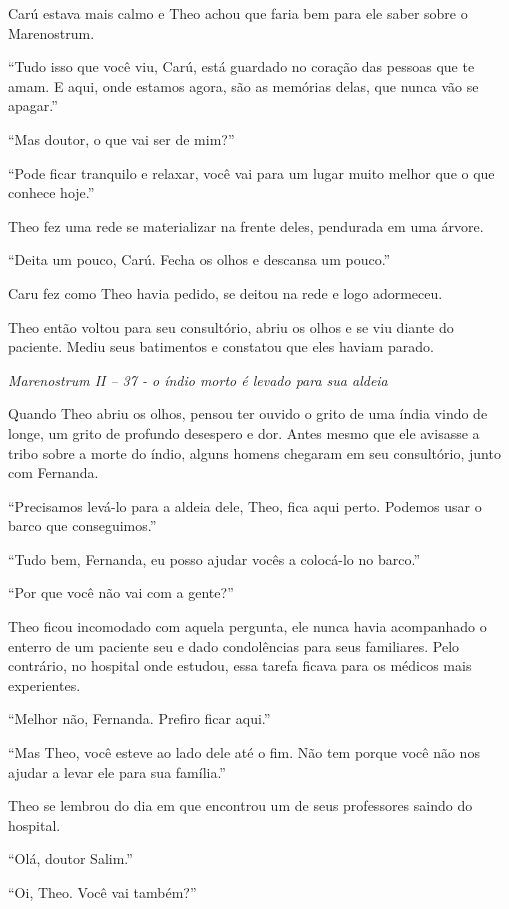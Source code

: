 Carú estava mais calmo e Theo achou que faria bem para ele saber sobre o
Marenostrum.

``Tudo isso que você viu, Carú, está guardado no coração das pessoas que
te amam. E aqui, onde estamos agora, são as memórias delas, que nunca
vão se apagar.''

``Mas doutor, o que vai ser de mim?''

``Pode ficar tranquilo e relaxar, você vai para um lugar muito melhor
que o que conhece hoje.''

Theo fez uma rede se materializar na frente deles, pendurada em uma
árvore.

``Deita um pouco, Carú. Fecha os olhos e descansa um pouco.''

Caru fez como Theo havia pedido, se deitou na rede e logo adormeceu.

Theo então voltou para seu consultório, abriu os olhos e se viu diante
do paciente. Mediu seus batimentos e constatou que eles haviam parado.

\asterisc

\emph{Marenostrum II -- 37 - o índio morto é levado para sua aldeia}

Quando Theo abriu os olhos, pensou ter
ouvido o grito de uma índia vindo de longe, um grito de profundo
desespero e dor. Antes mesmo que ele avisasse a tribo sobre a morte do
índio, alguns homens chegaram em seu consultório, junto com Fernanda.

``Precisamos levá-lo para a aldeia dele, Theo, fica aqui perto. Podemos
usar o barco que conseguimos.''

``Tudo bem, Fernanda, eu posso ajudar vocês a colocá-lo no barco.''

``Por que você não vai com a gente?''

Theo ficou incomodado com aquela pergunta, ele nunca havia acompanhado o
enterro de um paciente seu e dado condolências para seus familiares.
Pelo contrário, no hospital onde estudou, essa tarefa ficava para os
médicos mais experientes.

``Melhor não, Fernanda. Prefiro ficar aqui.''

``Mas Theo, você esteve ao lado dele até o fim. Não tem porque você não
nos ajudar a levar ele para sua família.''

Theo se lembrou do dia em que encontrou um de seus professores saindo do
hospital.

``Olá, doutor Salim.''

``Oi, Theo. Você vai também?''

